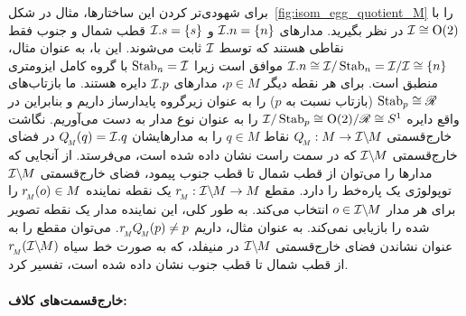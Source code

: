 برای شهودی‌تر کردن این ساختارها، مثال در شکل~\ref{fig:isom_egg_quotient_M} را با $\mathcal{I} \cong \operatorname{O}(2)$ در نظر بگیرید.
مدارهای $\mathcal{I}.n = \{n\}$ و $\mathcal{I}.s = \{s\}$ قطب شمال و جنوب فقط نقاطی هستند که توسط $\mathcal{I}$ ثابت می‌شوند.
این با، به عنوان مثال، $\mathcal{I}.n \cong \mathcal{I}/\operatorname{Stab}_{n} = \mathcal{I}/\mathcal{I} \cong \{n\}$ موافق است زیرا $\operatorname{Stab}_{n}=\mathcal{I}$ با گروه کامل ایزومتری منطبق است.
برای هر نقطه دیگر $p\in M$، مدارهای $\mathcal{I}.p$ دایره هستند.
ما بازتاب‌های $\operatorname{Stab}_{p} \cong \mathscr{R}$ (بازتاب نسبت به $p$) را به عنوان زیرگروه پایدارساز داریم و بنابراین در واقع دایره $\mathcal{I}/\operatorname{Stab}_{p} \cong \operatorname{O}(2)/\mathscr{R} \cong S^1$ را به عنوان نوع مدار به دست می‌آوریم.
نگاشت خارج‌قسمتی $\QM:M\to\IM$ نقاط $q\in M$ را به مدارهایشان $\QM(q) = \I.q$ در فضای خارج‌قسمتی $\mathcal{I}\backslash\mkern-1.5mu M$ که در سمت راست نشان داده شده است، می‌فرستد.
از آنجایی که مدارها را می‌توان از قطب شمال تا قطب جنوب پیمود، فضای خارج‌قسمتی $\mathcal{I}\backslash\mkern-1.5mu M$ توپولوژی یک پاره‌خط را دارد.
مقطع $\rM:\IM\to M$ یک نقطه نماینده $\rM(o) \in M$ را برای هر مدار $o \in \mathcal{I}\backslash\mkern-1.5mu M$ انتخاب می‌کند.
به طور کلی، این نماینده مدار یک نقطه تصویر شده را بازیابی نمی‌کند.
به عنوان مثال، داریم $\rM\QM(p) \neq p$.
می‌توان مقطع را به عنوان نشاندن فضای خارج‌قسمتی $\mathcal{I}\backslash\mkern-1.5mu M$ در منیفلد، که به صورت خط سیاه $\rM(\IM)$ از قطب شمال تا قطب جنوب نشان داده شده است، تفسیر کرد.





\paragraph{خارج‌قسمت‌های کلاف:}

